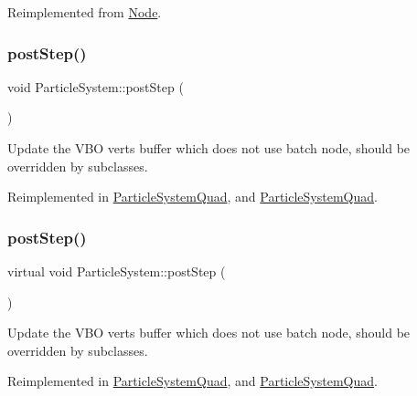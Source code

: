 Reimplemented from \hyperlink{classNode_ac83de835ea315e3179d4293acd8903ac}{Node}.

\mbox{\label{classParticleSystem_a95e820b4193a63ba26d0995224458744}} 
\subsubsection{\texorpdfstring{post\+Step()}{postStep()}\hspace{0.1cm}{\footnotesize\ttfamily [1/2]}}
{\footnotesize\ttfamily void Particle\+System\+::post\+Step (\begin{DoxyParamCaption}{ }\end{DoxyParamCaption})\hspace{0.3cm}{\ttfamily [virtual]}}

Update the V\+BO verts buffer which does not use batch node, should be overridden by subclasses. 

Reimplemented in \hyperlink{classParticleSystemQuad_a8c357c48c5ade4091b73245068c8cbe3}{Particle\+System\+Quad}, and \hyperlink{classParticleSystemQuad_a01acd79f49bb71657e40e856d9d7456b}{Particle\+System\+Quad}.

\mbox{\label{classParticleSystem_a234dc9e985d7e742c8fe8ee548b9ff7c}} 
\subsubsection{\texorpdfstring{post\+Step()}{postStep()}\hspace{0.1cm}{\footnotesize\ttfamily [2/2]}}
{\footnotesize\ttfamily virtual void Particle\+System\+::post\+Step (\begin{DoxyParamCaption}{ }\end{DoxyParamCaption})\hspace{0.3cm}{\ttfamily [virtual]}}

Update the V\+BO verts buffer which does not use batch node, should be overridden by subclasses. 

Reimplemented in \hyperlink{classParticleSystemQuad_a8c357c48c5ade4091b73245068c8cbe3}{Particle\+System\+Quad}, and \hyperlink{classParticleSystemQuad_a01acd79f49bb71657e40e856d9d7456b}{Particle\+System\+Quad}.

